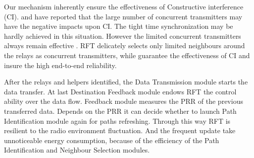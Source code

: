 \documentclass[conference]{IEEEtran}
\begin{document}
Our mechanism inherently ensure the effectiveness of Constructive interference (CI). \cite{wang2013exploiting} and \cite{doddavenkatappa2013splash} have reported that the large number of concurrent transmitters may have the negative impacts upon CI. The tight time synchronization may be hardly achieved in this situation. However the limited concurrent transmitters always remain effective \cite{doddavenkatappa2013splash}. RFT delicately selects only limited neighbours around the relays as concurrent transmitters, while guarantee the effectiveness of CI and insure the high end-to-end reliability.

After the relays and helpers identified, the Data Transmission module starts the data transfer. At last Destination Feedback module endows RFT the control ability over the data flow. Feedback module measures the PRR of the previous transferred data. Depends on the PRR it can decide whether to launch Path Identification module again for paths refreshing. Through this way RFT is resilient to the radio environment fluctuation. And the frequent update take unnoticeable energy consumption, because of the efficiency of the Path Identification and Neighbour Selection modules. 


\end{document}
